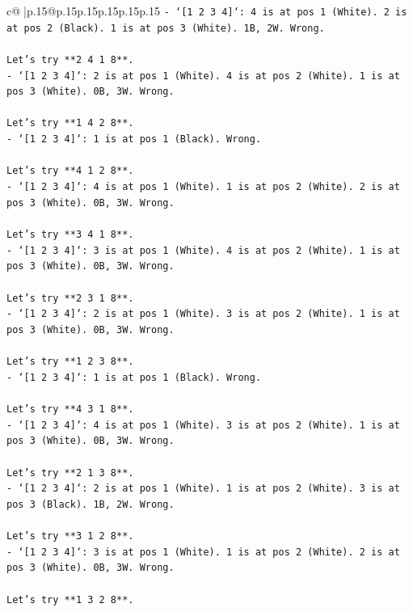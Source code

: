 \documentclass{article}
\begin{document}
{\begin{supertabular}{c@{$\;$}|p{.15\linewidth}@{}p{.15\linewidth}p{.15\linewidth}p{.15\linewidth}p{.15\linewidth}p{.15\linewidth}}
{{{\texttt{{-} `{[}1 2 3 4{]}`: 4 is at pos 1 (White). 2 is at pos 2 (Black). 1 is at pos 3 (White). 1B, 2W. Wrong.} \\
\\ 
\texttt{Let's try **2 4 1 8**.} \\
\texttt{{-} `{[}1 2 3 4{]}`: 2 is at pos 1 (White). 4 is at pos 2 (White). 1 is at pos 3 (White). 0B, 3W. Wrong.} \\
\\ 
\texttt{Let's try **1 4 2 8**.} \\
\texttt{{-} `{[}1 2 3 4{]}`: 1 is at pos 1 (Black). Wrong.} \\
\\ 
\texttt{Let's try **4 1 2 8**.} \\
\texttt{{-} `{[}1 2 3 4{]}`: 4 is at pos 1 (White). 1 is at pos 2 (White). 2 is at pos 3 (White). 0B, 3W. Wrong.} \\
\\ 
\texttt{Let's try **3 4 1 8**.} \\
\texttt{{-} `{[}1 2 3 4{]}`: 3 is at pos 1 (White). 4 is at pos 2 (White). 1 is at pos 3 (White). 0B, 3W. Wrong.} \\
\\ 
\texttt{Let's try **2 3 1 8**.} \\
\texttt{{-} `{[}1 2 3 4{]}`: 2 is at pos 1 (White). 3 is at pos 2 (White). 1 is at pos 3 (White). 0B, 3W. Wrong.} \\
\\ 
\texttt{Let's try **1 2 3 8**.} \\
\texttt{{-} `{[}1 2 3 4{]}`: 1 is at pos 1 (Black). Wrong.} \\
\\ 
\texttt{Let's try **4 3 1 8**.} \\
\texttt{{-} `{[}1 2 3 4{]}`: 4 is at pos 1 (White). 3 is at pos 2 (White). 1 is at pos 3 (White). 0B, 3W. Wrong.} \\
\\ 
\texttt{Let's try **2 1 3 8**.} \\
\texttt{{-} `{[}1 2 3 4{]}`: 2 is at pos 1 (White). 1 is at pos 2 (White). 3 is at pos 3 (Black). 1B, 2W. Wrong.} \\
\\ 
\texttt{Let's try **3 1 2 8**.} \\
\texttt{{-} `{[}1 2 3 4{]}`: 3 is at pos 1 (White). 1 is at pos 2 (White). 2 is at pos 3 (White). 0B, 3W. Wrong.} \\
\\ 
\texttt{Let's try **1 3 2 8**.} \\
}}}
\end{supertabular}}
\end{document}
